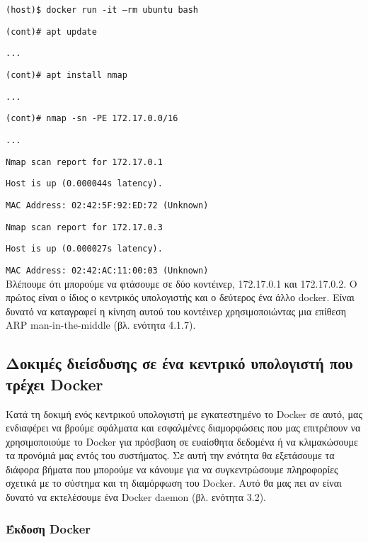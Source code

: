 \texttt{\textlatin{(host)\$ docker run -it --rm ubuntu bash}}

\texttt{\textlatin{(cont)\# apt update}}

\texttt{\textlatin{...}}

\texttt{\textlatin{(cont)\# apt install nmap}}

\texttt{\textlatin{...}}

\texttt{\textlatin{(cont)\# nmap -sn -PE 172.17.0.0/16}}

\texttt{\textlatin{...}}

\texttt{\textlatin{Nmap scan report for 172.17.0.1}}

\texttt{\textlatin{Host is up (0.000044s latency).}}

\texttt{\textlatin{MAC Address: 02:42:5F:92:ED:72 (Unknown)}}

\texttt{\textlatin{Nmap scan report for 172.17.0.3}}
 
\texttt{\textlatin{Host is up (0.000027s latency).}}

\texttt{\textlatin{MAC Address: 02:42:AC:11:00:03 (Unknown)}} \\

Βλέπουμε ότι μπορούμε να φτάσουμε σε δύο κοντέινερ, 172.17.0.1 και 172.17.0.2.
Ο πρώτος είναι ο ίδιος ο κεντρικός υπολογιστής και ο δεύτερος ένα άλλο
\textlatin{docker}. Είναι δυνατό να καταγραφεί η κίνηση αυτού του κοντέινερ
χρησιμοποιώντας μια επίθεση \textlatin{ARP man-in-the-middle} (βλ.
ενότητα 4.1.7).

\subsection{Δοκιμές διείσδυσης σε ένα κεντρικό υπολογιστή που τρέχει
\textlatin{Docker}}

Κατά τη δοκιμή ενός κεντρικού υπολογιστή με εγκατεστημένο το \textlatin{Docker}
σε αυτό, μας ενδιαφέρει να βρούμε σφάλματα και εσφαλμένες διαμορφώσεις που μας
επιτρέπουν να χρησιμοποιούμε το \textlatin{Docker} για πρόσβαση σε ευαίσθητα
δεδομένα ή να κλιμακώσουμε τα προνόμιά μας εντός του συστήματος. Σε αυτή την
ενότητα θα εξετάσουμε τα διάφορα βήματα που μπορούμε να κάνουμε για να
συγκεντρώσουμε πληροφορίες σχετικά με το σύστημα και τη διαμόρφωση του
\textlatin{Docker}. Αυτό θα μας πει αν είναι δυνατό να εκτελέσουμε
ένα \textlatin{Docker daemon} (βλ. ενότητα 3.2).

\subsubsection{Έκδοση \textlatin{Docker}}

